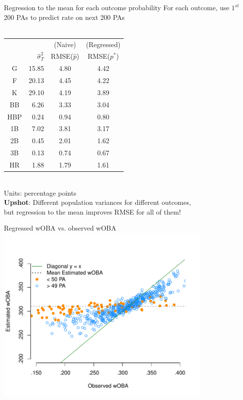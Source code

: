 \documentclass{beamer}
\begin{document}
\begin{frame}{Regression to the mean for each outcome probability}
For each outcome, use $1^{st}$ 200 PAs to predict rate on next 200 PAs\\~\\
\centering
\begin{tabular}{c|r|cc}
\multicolumn{2}{c}{}    & (Naive)           & (Regressed)\\
    & $\hat\sigma^2_T$  & RMSE($\hat p$)    & RMSE($p^*$)\\
    \hline
G   & 15.85             & 4.80              & 4.42\\
F   & 20.13             & 4.45              & 4.22\\
K   & 29.10             & 4.19              & 3.89\\
BB  &  6.26             & 3.33              & 3.04\\
HBP &  0.24             & 0.94              & 0.80\\
1B  &  7.02             & 3.81              & 3.17\\
2B  &  0.45             & 2.01              & 1.62\\
3B  &  0.13             & 0.74              & 0.67\\
HR  &  1.88             & 1.79              & 1.61
\end{tabular}\\
{\scriptsize Units: percentage points}\\
{\bf Upshot}: Different population variances for different outcomes,\\
but regression to the mean improves RMSE for all of them!
\end{frame}

\begin{frame}{Regressed wOBA vs. observed wOBA}
\centering
\includegraphics[width = 0.8\textwidth]
    {../figs/woba-observed-v-estimated-slides.pdf}
\end{frame}
\end{document}
